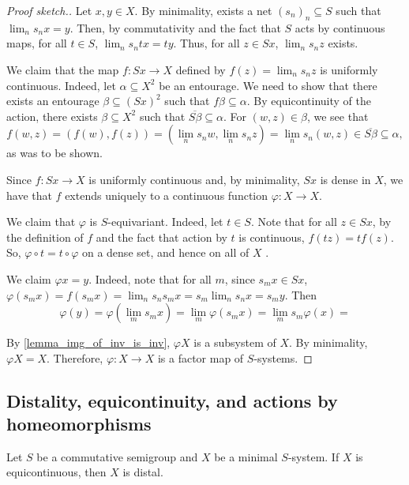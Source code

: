 \begin{proof}[Proof sketch.]
    Let $x, y \in X$.  By minimality, exists a net $(s_n)_n \subseteq S$ such that $\lim_n s_n x = y$.  Then, by commutativity and the fact that $S$ acts by continuous maps, for all $t \in S$, $\lim_n s_n tx = ty$.  Thus, for all $z \in Sx$, $\lim_n s_n z$ exists.

    We claim that the map $f: Sx \to X$ defined by $f(z) = \lim_n s_n z$ is uniformly continuous. Indeed, let $\alpha \subseteq X^2$ be an entourage.  We need to show that there exists an entourage $\beta \subseteq (Sx)^2$ such that $f \beta \subseteq \alpha$.  By equicontinuity of the action, there exists $\beta \subseteq X^2$ such that $\overline{S \beta} \subseteq \alpha$. For $(w,z) \in \beta$, we see that
    \[f(w,z) = (f(w),f(z)) = (\lim_n s_n w, \lim_n s_n z) = \lim_n s_n (w,z) \in \overline{S\beta} \subseteq \alpha,\]
    as was to be shown.

    Since $f: Sx \to X$ is uniformly continuous and, by minimality, $Sx$ is dense in $X$, we have that $f$ extends uniquely to a continuous function $\varphi: X \to X$.

    We claim that $\varphi$ is $S$-equivariant.  Indeed, let $t \in S$.  Note that for all $z \in Sx$, by the definition of $f$ and the fact that action by $t$ is continuous, $f(tz) = t f(z)$.  So, $\varphi \circ t = t \circ \varphi$ on a dense set, and hence on all of $X$ .
    
    We claim $\varphi x = y$. Indeed, note that for all $m$, since $s_m x \in Sx$, $\varphi(s_m x) = f(s_m x) = \lim_{n} s_n s_m x = s_m \lim_n s_n x = s_m y$.  Then
    \[\varphi(y) = \varphi(\lim_m s_m x) = \lim_m \varphi(s_m x) = \lim_m s_m \varphi (x) = \]
    
    By \cref{lemma_img_of_inv_is_inv}, $\varphi X$ is a subsystem of $X$.  By minimality, $\varphi X = X$.  Therefore, $\varphi: X \to X$ is a factor map of $S$-systems.
\end{proof}

\subsection{Distality, equicontinuity, and actions by homeomorphisms}

\begin{lemma}
\label{lemma_equi_implies_distal}
    Let $S$ be a commutative semigroup and $X$ be a minimal $S$-system.  If $X$ is equicontinuous, then $X$ is distal.
\end{lemma}

